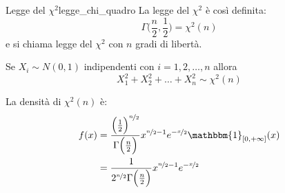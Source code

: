 \documentclass[12pt]{report}
\newcounter{definition}
\newcommand{\nmu}{}
\begin{document}
	\begin{definition}{\nmu Legge del $\chi^2$}{legge_chi_quadro}
		La legge del $\chi^2$ è così definita:
		\[
		\Gamma\Bigg(\dfrac{n}{2}, \dfrac{1}{2}\Bigg) = \chi^2(n)
		\]
		e si chiama legge del $\chi^2$ con $n$ gradi di libertà.
	\end{definition}
	\begin{note}{}{}
		Se $X_i \sim N(0, 1)$ indipendenti con $i= 1, 2, \dots, n$ allora \[X_1^2 + X_2^2 + \dots + X_n^2 \sim \chi^2(n)\]
	\end{note}
	La densità di $\chi^2(n)$ è:
	\begin{align*}
		f(x) &= \dfrac{\Big(\frac{1}{2}\Big)^{\nicefrac{n}{2}}}{\Gamma\Big(\frac{n}{2}\Big)}x^{\nicefrac{n}{2} - 1}e^{-\nicefrac{x}{2}}\mathbbm{1}_{[0, +\infty]}(x) \\
		&= \dfrac{1}{2^{\nicefrac{n}{2}}\Gamma\Big(\frac{n}{2}\Big)}x^{\nicefrac{n}{2} - 1}e^{-\nicefrac{x}{2}}
	\end{align*}
\end{document}
